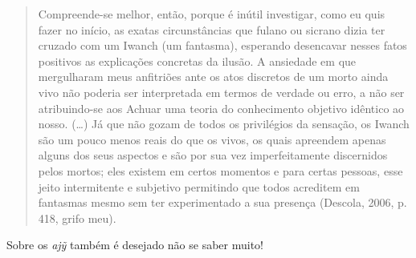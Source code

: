 \begin{quote}
Compreende-se melhor, então, porque é inútil investigar, como eu quis
fazer no início, as exatas circunstâncias que fulano ou sicrano dizia
ter cruzado com um Iwanch (um fantasma), esperando desencavar nesses
fatos positivos as explicações concretas da ilusão. A ansiedade em que
mergulharam meus anfitriões ante os atos discretos de um morto ainda
vivo não poderia ser interpretada em termos de verdade ou erro, a não
ser atribuindo-se aos Achuar uma teoria do conhecimento objetivo
idêntico ao nosso. (\ldots{}) Já que não gozam de todos os privilégios da
sensação, os Iwanch são um pouco menos reais do que os vivos, os quais
apreendem apenas alguns dos seus aspectos e são por sua vez
imperfeitamente discernidos pelos mortos; eles existem em certos
momentos e para certas pessoas, esse jeito intermitente e subjetivo
permitindo que todos acreditem em fantasmas mesmo sem ter experimentado
a sua presença (Descola, 2006, p. 418, grifo meu).
\end{quote}

Sobre os \emph{ajỹ} também é desejado não se saber muito!
